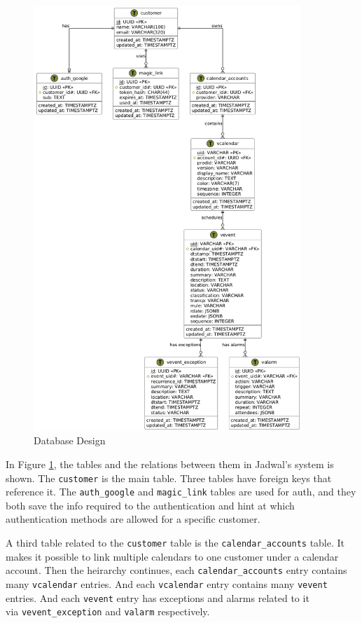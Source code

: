 \documentclass[12pt,a4paper]{report}
\begin{document}
\begin{figure}[!h]
    \centering
    \includegraphics[width=0.9\textwidth]{images/docs/diagrams/er/database/Database Design.png}
    \caption{Database Design}
    \label{fig:database-design}
\end{figure}

\newpage

In Figure \ref{fig:database-design}, the tables and the relations between them in Jadwal's system is shown. The \texttt{customer} is the main table. Three tables have foreign keys that reference it. The \texttt{auth\_google} and \texttt{magic\_link} tables are used for auth, and they both save the info required to the authentication and hint at which authentication methods are allowed for a specific customer.

A third table related to the \texttt{customer} table is the \texttt{calendar\_accounts} table. It makes it possible to link multiple calendars to one customer under a calendar account. Then the heirarchy continues, each \texttt{calendar\_accounts} entry contains many \texttt{vcalendar} entries. And each \texttt{vcalendar} entry contains many \texttt{vevent} entries. And each \texttt{vevent} entry has exceptions and alarms related to it\\via \texttt{vevent\_exception} and \texttt{valarm} respectively.



\end{document}
